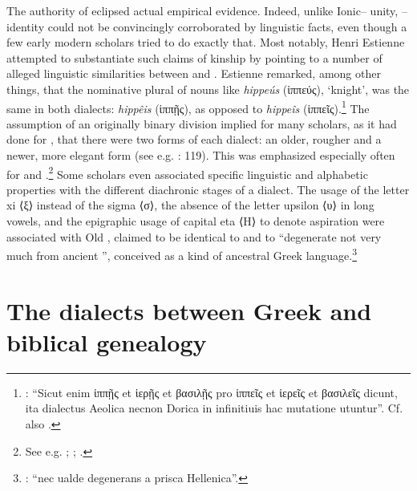 The authority of  eclipsed actual empirical evidence. Indeed, unlike Ion\-ic– unity, – identity could not be convincingly corroborated by linguistic facts, even though a few early modern scholars tried to do exactly that. Most notably, Henri Estienne attempted to substantiate such claims of kinship by pointing to a number of alleged linguistic similarities between  and . Estienne remarked, among other things, that the nominative plural of nouns like \textit{hippeús} (ἱππεύς), ‘knight’, was the same in both dialects: \textit{hippêis} (ἱππῇς), as opposed to  \textit{hippeîs} (ἱππεῖς).\footnote{\citet[25--26]{Estienne1581}: “Sicut enim ἱππῇς et ἱερῇς et βασιλῇς pro ἱππεῖς et ἱερεῖς et βασιλεῖς dicunt, ita dialectus Aeolica necnon Dorica in infinitiuis hac mutatione utuntur”. Cf. also \citet[179]{Trendelenburg1782}.} The assumption of an originally binary division implied for many scholars, as it had done for , that there were two forms of each dialect: an older, rougher and a newer, more elegant form (see e.g. \citealt{Mazzocchi1754}: 119). This was emphasized especially often for  and .\footnote{See e.g. \citet[18]{Hauptmann1737}; \citet[137]{Walch1772}; \citet[\textsc{iv–v}]{Facius1782}.} Some scholars even associated specific linguistic and alphabetic properties with the different diachronic stages of a dialect. The usage of the letter xi ⟨ξ⟩ instead of the sigma ⟨σ⟩, the absence of the letter upsilon ⟨υ⟩ in long vowels, and the epigraphic usage of capital eta ⟨H⟩ to denote aspiration were associated with Old , claimed to be identical to  and to “degenerate not very much from ancient ”, conceived as a kind of ancestral Greek language.\footnote{\citet[4--5]{Munthe1748}: “nec ualde degenerans a prisca Hellenica”.}

\section{The dialects between Greek and biblical genealogy}\label{sec:5.3}

